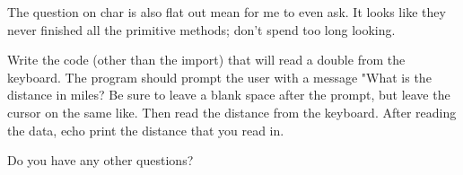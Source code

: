\documentclass[letterpaper,12pt]{exam}
\begin{document}
\begin{questions}
\begin{samepage}
		   The question on char is also flat out mean for me to even ask.  It looks like they never finished all the primitive methods; don't spend too long looking.  
	\end{samepage}
	\clearpage
	\begin{samepage}
		\question Write the code (other than the import) that will read a double from the keyboard.  The program should prompt the user with a message "What is the distance in miles?  Be sure to leave a blank space after the prompt, but leave the cursor on the same like.  Then read the distance from the keyboard.  After reading the data, echo print the distance that you read in.
		\vspace{155mm}
	\end{samepage}
	

\begin{samepage}
	\question Do you have any other questions?
	\vspace{30mm}
\end{samepage}

\end{questions}
\end{document}
